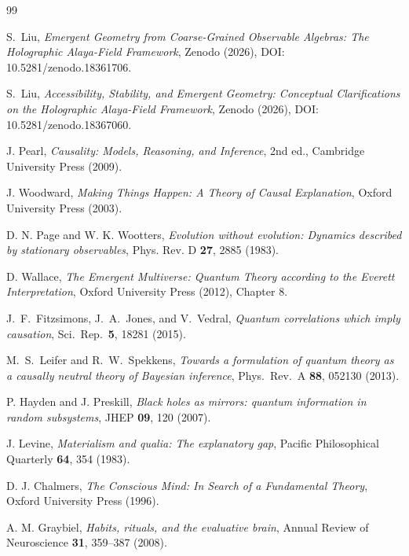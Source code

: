 \documentclass[11pt,a4paper]{article}
\begin{document}

\begin{thebibliography}{99}

S.~Liu, \emph{Emergent Geometry from Coarse-Grained Observable Algebras: The Holographic Alaya-Field Framework}, Zenodo (2026), DOI: 10.5281/zenodo.18361706.

S.~Liu, \emph{Accessibility, Stability, and Emergent Geometry: Conceptual Clarifications on the Holographic Alaya-Field Framework}, Zenodo (2026), DOI: 10.5281/zenodo.18367060.

J. Pearl, \emph{Causality: Models, Reasoning, and Inference}, 2nd ed., Cambridge University Press (2009).

J. Woodward, \emph{Making Things Happen: A Theory of Causal Explanation}, Oxford University Press (2003).

D. N. Page and W. K. Wootters, \emph{Evolution without evolution: Dynamics described by stationary observables}, Phys. Rev. D \textbf{27}, 2885 (1983).

D. Wallace, \emph{The Emergent Multiverse: Quantum Theory according to the Everett Interpretation}, Oxford University Press (2012), Chapter 8.

J.~F.~Fitzsimons, J.~A.~Jones, and V.~Vedral,
\emph{Quantum correlations which imply causation},
Sci.\ Rep.\ \textbf{5}, 18281 (2015).

M.~S.~Leifer and R.~W.~Spekkens,
\emph{Towards a formulation of quantum theory as a causally neutral theory of Bayesian inference},
Phys.\ Rev.\ A \textbf{88}, 052130 (2013).

P. Hayden and J. Preskill, \emph{Black holes as mirrors: quantum information in random subsystems}, JHEP \textbf{09}, 120 (2007).

J. Levine, \emph{Materialism and qualia: The explanatory gap}, Pacific Philosophical Quarterly \textbf{64}, 354 (1983).

D. J. Chalmers, \emph{The Conscious Mind: In Search of a Fundamental Theory}, Oxford University Press (1996).

A. M. Graybiel, \emph{Habits, rituals, and the evaluative brain}, Annual Review of Neuroscience \textbf{31}, 359--387 (2008).


\end{thebibliography}
\end{document}
